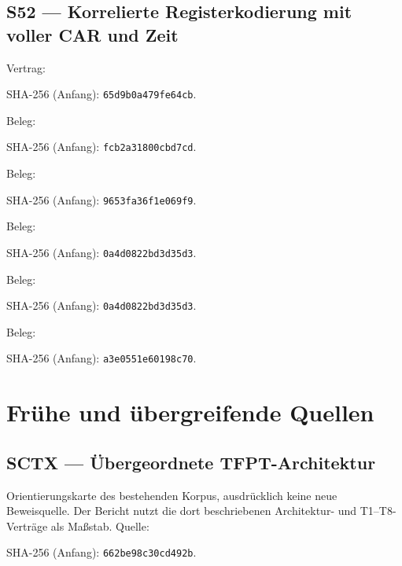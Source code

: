 \subsection*{S52 — Korrelierte Registerkodierung mit voller CAR und Zeit}\label{s:52}
{\small{}\par}
Vertrag: \par
{\footnotesize SHA-256 (Anfang): \texttt{65d9b0a479fe64cb}.}\par
Beleg: \par
{\footnotesize SHA-256 (Anfang): \texttt{fcb2a31800cbd7cd}.}\par
Beleg: \par
{\footnotesize SHA-256 (Anfang): \texttt{9653fa36f1e069f9}.}\par
Beleg: \par
{\footnotesize SHA-256 (Anfang): \texttt{0a4d0822bd3d35d3}.}\par
Beleg: \par
{\footnotesize SHA-256 (Anfang): \texttt{0a4d0822bd3d35d3}.}\par
Beleg: \par
{\footnotesize SHA-256 (Anfang): \texttt{a3e0551e60198c70}.}\par
\section{Frühe und übergreifende Quellen}
\subsection*{SCTX — Übergeordnete TFPT-Architektur}\label{s:CTX}
Orientierungskarte des bestehenden Korpus, ausdrücklich keine neue Beweisquelle. Der Bericht nutzt die dort beschriebenen Architektur- und T1--T8-Verträge als Maßstab.
Quelle: \par{\footnotesize SHA-256 (Anfang): \texttt{662be98c30cd492b}.}\par
